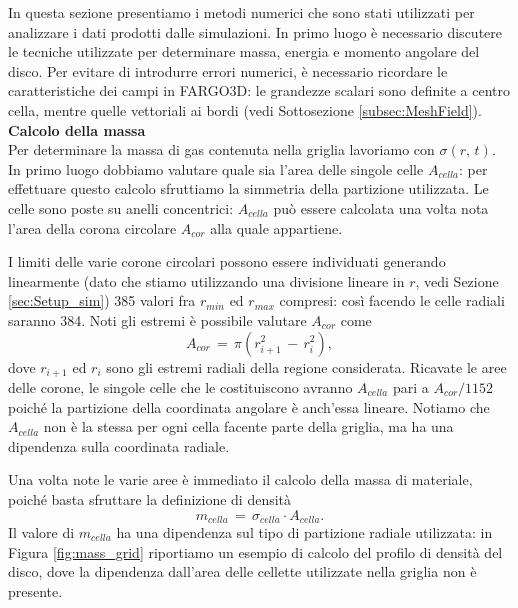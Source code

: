 In questa sezione presentiamo i metodi numerici che sono stati utilizzati per analizzare i dati prodotti dalle simulazioni. In primo luogo è necessario discutere le tecniche utilizzate per determinare massa, energia e momento angolare del disco.
Per evitare di introdurre errori numerici, è necessario ricordare le caratteristiche dei campi in FARGO3D: le grandezze scalari sono definite a centro cella, mentre quelle vettoriali ai bordi (vedi Sottosezione \ref{subsec:MeshField}).\\

\textbf{Calcolo della massa}\\

Per determinare la massa di gas contenuta nella griglia lavoriamo con $\sigma(r,\,t)$. In primo luogo dobbiamo valutare quale sia l'area delle singole celle $A_{cella}$: per effettuare questo calcolo sfruttiamo la simmetria della partizione utilizzata. Le celle sono poste su anelli concentrici: $A_{cella}$ può essere calcolata una volta nota l'area della corona circolare $A_{cor}$ alla quale appartiene.

I limiti delle varie corone circolari possono essere individuati generando linearmente (dato che stiamo utilizzando una divisione lineare in $r$, vedi Sezione \ref{sec:Setup_sim}) 385 valori fra $r_{min}$ ed $r_{max}$ compresi: così facendo le celle radiali saranno 384. Noti gli estremi è possibile valutare $A_{cor}$ come 
\begin{equation}
A_{cor}\,=\,\pi(r_{i+1}^2\,-\,r_{i}^2),
\label{eq:a_cor}
\end{equation}
dove $r_{i+1}$ ed $r_i$ sono gli estremi radiali della regione considerata.
Ricavate le aree delle corone, le singole celle che le costituiscono avranno $A_{cella}$ pari a $A_{cor}/1152$ poiché la partizione della coordinata angolare è anch'essa lineare.
Notiamo che $A_{cella}$ non è la stessa per ogni cella facente parte della griglia, ma ha una dipendenza sulla coordinata radiale.

Una volta note le varie aree è immediato il calcolo della massa di materiale, poiché basta sfruttare la definizione di densità
\begin{equation}
m_{cella}\,=\,\sigma_{cella} \cdot A_{cella}.
\label{eq:mass_cella}
\end{equation}
Il valore di $m_{cella}$ ha una dipendenza sul tipo di partizione radiale utilizzata: in Figura \ref{fig:mass_grid} riportiamo un esempio di calcolo del profilo di densità del disco, dove la dipendenza dall'area delle cellette utilizzate nella griglia non è presente.

